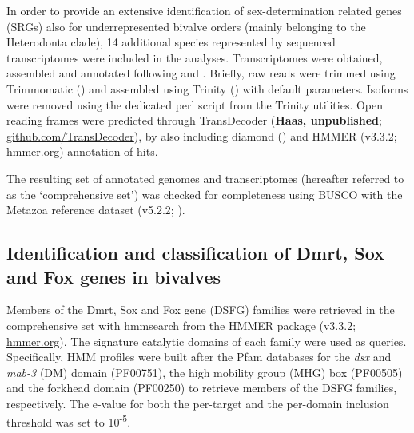\documentclass[../main.tex]{subfiles}
\begin{document}
In order to provide an extensive identification of sex-determination related genes (SRGs) also for underrepresented bivalve orders (mainly belonging to the Heterodonta clade), 14 additional species represented by sequenced transcriptomes were included in the analyses. Transcriptomes were obtained, assembled and annotated following \textbf{\cite{piccinini2021mitonuclear}} and \textbf{\cite{iannello2023signatures}}. Briefly, raw reads were trimmed using Trimmomatic (\textbf{\cite{bolger2014trimmomatic}}) and assembled using Trinity (\textbf{\cite{grabherr2011trinity}}) with default parameters. Isoforms were removed using the dedicated perl script from the Trinity utilities. Open reading frames were predicted through TransDecoder (\textbf{Haas, unpublished}; \href{https://github.com/TransDecoder/TransDecoder}{github.com/TransDecoder}), by also including diamond (\textbf{\cite{buchfink2015fast}}) and HMMER (v3.3.2; \href{http://hmmer.org/}{hmmer.org}) annotation of hits.

The resulting set of annotated genomes and transcriptomes (hereafter referred to as the ‘comprehensive set’) was checked for completeness using BUSCO with the Metazoa reference dataset (v5.2.2; \textbf{\cite{manni2021busco}}).

\subsection{Identification and classification of Dmrt, Sox and Fox genes in bivalves}
Members of the Dmrt, Sox and Fox gene (DSFG) families were retrieved in the comprehensive set with hmmsearch from the HMMER package (v3.3.2; \href{http://hmmer.org/}{hmmer.org}). The signature catalytic domains of each family were used as queries. Specifically, HMM profiles were built after the Pfam databases for the \textit{dsx} and \textit{mab-3} (DM) domain (PF00751), the high mobility group (MHG) box (PF00505) and the forkhead domain (PF00250) to retrieve members of the DSFG families, respectively. The e-value for both the per-target and the per-domain inclusion threshold was set to 10\textsuperscript{-5}.
\end{document}
